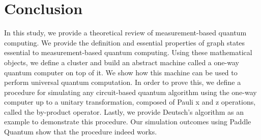 \section{Conclusion}

In this study, we provide a theoretical review of measurement-based quantum computing. We provide the definition and essential properties of graph states essential to measurement-based quantum computing. Using these mathematical objects, we define a cluster and build an abstract machine called a one-way quantum computer on top of it. We show how this machine can be used to perform universal quantum computation. In order to prove this, we define a procedure for simulating any circuit-based quantum algorithm using the one-way computer up to a unitary transformation, composed of Pauli x and z operations, called the by-product operator. Lastly, we provide  Deutsch's algorithm as an example to demonstrate this procedure. Our simulation outcomes using Paddle Quantum show that the procedure indeed works. 